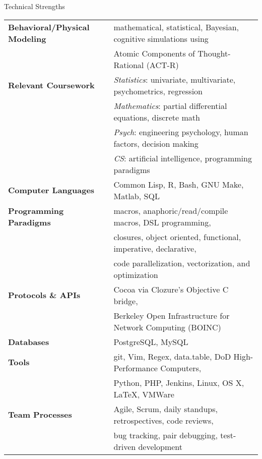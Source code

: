 

\begin{rSection}{Technical Strengths}
  \begin{tabular}{ @{} >{\bfseries}l @{\hspace{4ex}} l }
    Behavioral/Physical Modeling &	mathematical, statistical, Bayesian, cognitive simulations using \\
    &					Atomic Components of Thought-Rational (ACT-R) \\
    [.13cm]
    Relevant Coursework &		\emph{Statistics}: univariate, multivariate, psychometrics, regression \\
    &					\emph{Mathematics}: partial differential equations, discrete math \\
    &					\emph{Psych}: engineering psychology, human factors, decision making \\ 
    &					\emph{CS}: artificial intelligence, programming paradigms \\
    [.13cm]
    Computer Languages &		Common Lisp, R, Bash, GNU Make, Matlab, SQL \\
    [.13cm]
    Programming Paradigms &		macros, anaphoric/read/compile macros, DSL programming, \\
    & 					closures, object oriented, functional, imperative, declarative, \\
    &					code parallelization, vectorization, and optimization \\
    [.13cm]
    Protocols \& APIs & 		Cocoa via Clozure's Objective C bridge, \\
    &					Berkeley Open Infrastructure for Network Computing (BOINC) \\
    [.13cm]
    Databases &				PostgreSQL, MySQL \\
    [.13cm]
    Tools & 				git, Vim, Regex, data.table, DoD High-Performance Computers, \\
    &					Python, PHP, Jenkins, Linux, OS X, \LaTeX, VMWare\\
    [.13cm]
    Team Processes & 			Agile, Scrum, daily standups, retrospectives, code reviews, \\
    & 					bug tracking, pair debugging, test-driven development \\
  \end{tabular}
\end{rSection}

